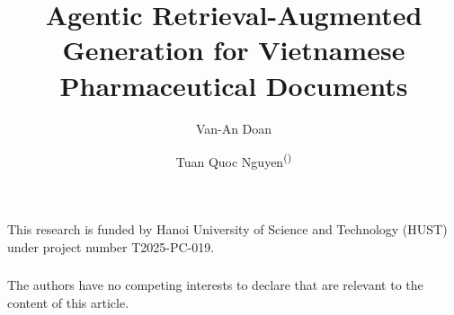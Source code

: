 \documentclass{llncs}
\begin{document}
\title{Agentic Retrieval-Augmented Generation for Vietnamese Pharmaceutical Documents}
\author{Van-An Doan \and Tuan Quoc Nguyen\textsuperscript{(\Letter)}}
\maketitle








\begin{credits}
\subsubsection{\ackname} This research is funded by Hanoi University of Science and Technology (HUST) under project number T2025-PC-019.

\subsubsection{\discintname} The authors have no competing interests to declare that are relevant to the content of this article.
\end{credits}



\end{document}
